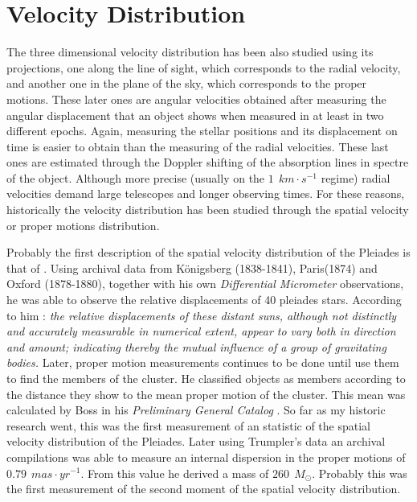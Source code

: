 \section{Velocity Distribution}

The three dimensional velocity distribution has been also studied using its projections, one along the line of sight, which corresponds to the radial velocity, and another one in the plane of the sky, which corresponds to the proper motions. These later ones are angular velocities obtained after measuring the angular displacement that an object shows when measured  in at least in two different epochs. Again, measuring the stellar positions and its displacement on time is easier to obtain than the measuring of the radial velocities. These last ones are estimated through the Doppler shifting of the absorption lines in spectre of the object. Although more precise (usually on the $1 \ \ km\cdot s^{-1}$ regime) radial velocities demand large telescopes and longer observing times. For these reasons, historically the velocity distribution has been studied through the spatial velocity or proper motions distribution. 

Probably the first description of the spatial velocity distribution of the Pleiades is that of \citet{1884MNRAS..44..355P}. Using archival data from  Königsberg (1838-1841), Paris(1874) and Oxford (1878-1880), together with his own \emph{Differential Micrometer} observations, he was able to observe the relative displacements of 40 pleiades stars. According to him \citep{1884MNRAS..44..355P}: \textit{the relative displacements of these distant suns, although not distinctly and accurately measurable in numerical extent, appear to vary both in direction and amount; indicating thereby the mutual influence of a group of gravitating bodies.} Later, proper motion measurements continues to be done until \citet{Trumpler1921} use them to find the members of the cluster. He classified objects as members according to the distance they show to the mean proper motion of the cluster.  This mean was calculated by Boss in his \emph{Preliminary General Catalog} \citep{Trumpler1921}. So far as my historic research went, this was the first measurement of an statistic of the spatial velocity distribution of the Pleiades. Later \citet{1938AJ.....47...25T} using Trumpler's data an archival compilations was able to measure an internal dispersion in the proper motions of $0.79\ \ mas\cdot yr^{-1}$. From this value he derived a mass of $260\ \ M_{\odot}$. Probably this was the first measurement of the second moment of the spatial velocity distribution.

